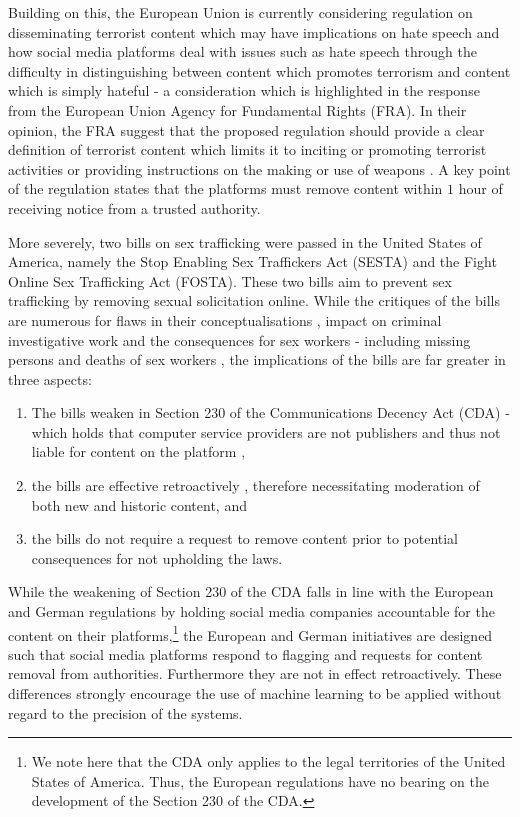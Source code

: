 Building on this, the European Union is currently considering regulation on disseminating terrorist content which may have implications on hate speech and how social media platforms deal with issues such as hate speech \citep{EUCommission:2018} through the difficulty in distinguishing between content which promotes terrorism and content which is simply hateful - a consideration which is highlighted in the response from the European Union Agency for Fundamental Rights (FRA).
In their opinion, the FRA suggest that the proposed regulation should provide a clear definition of terrorist content which limits it to inciting or promoting terrorist activities or providing instructions on the making or use of weapons \citep{FRA:2019}.
A key point of the regulation states that the platforms must remove content within $1$ hour of receiving notice from a trusted authority.

More severely, two bills on sex trafficking were passed in the United States of America, namely the Stop Enabling Sex Traffickers Act (SESTA) and the Fight Online Sex Trafficking Act (FOSTA).
These two bills aim to prevent sex trafficking by removing sexual solicitation online.
While the critiques of the bills are numerous for flaws in their conceptualisations \citep{Romano:2018}, impact on criminal investigative work \citep{Q:2018} and the consequences for sex workers - including missing persons and deaths of sex workers \citep{Blue:2018,Simon:2018}, the implications of the bills are far greater in three aspects:

\begin{enumerate}
  \item{The bills weaken \citep{Romano:2018,Stryker:2018} in Section 230 of the Communications Decency Act (CDA) - which holds that computer service providers are not publishers and thus not liable for content on the platform \citep{EFF:230},}
  \item{the bills are effective retroactively \citep{Stryker:2018}, therefore necessitating moderation of both new and historic content, and}
  \item{the bills do not require a request to remove content prior to potential consequences for not upholding the laws.}
\end{enumerate}

While the weakening of Section 230 of the CDA falls in line with the European and German regulations by holding social media companies accountable for the content on their platforms,\footnote{We note here that the CDA only applies to the legal territories of the United States of America.
Thus, the European regulations have no bearing on the development of the Section 230 of the CDA.} the European and German initiatives are designed such that social media platforms respond to flagging and requests for content removal from authorities.
Furthermore they are not in effect retroactively.
These differences strongly encourage the use of machine learning to be applied without regard to the precision of the systems.

